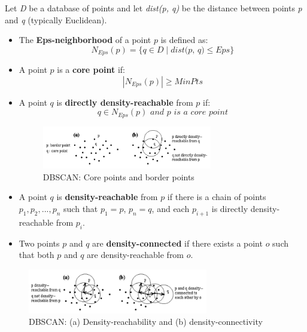 \documentclass[a4paper,12pt,twoside]{scrreprt}
\begin{document}
Let \textit{D} be a database of points and let \textit{dist(p, q)} be the
distance between points \textit{p} and \textit{q} (typically Euclidean).

\begin{itemize}
  \item The \textbf{Eps-neighborhood} of a point $p$ is defined as:
        \[
          N_{\textit{Eps}}(p) = \{q \in D \mid \textit{dist(p, q)} \leq
          \textit{Eps} \}
        \]

  \item A point $p$ is a \textbf{core point} if:
        \[
          |N_{\textit{Eps}}(p)| \geq \textit{MinPts}
        \]

  \item A point $q$ is \textbf{directly density-reachable} from $p$ if:
        \[
          q \in N_{\textit{Eps}}(p) \textit{ and } p \textit{ is a core point}
        \]

        \begin{figure}[htbp]
          \centering

          \includegraphics[width=0.7\textwidth]{Figures/background/dbscan_core_points_and_border_points.png}
          \caption{DBSCAN: Core points and border points
            \cite{ester_density-based_nodate}}
          \label{fig:dbscan-core_points}
        \end{figure}

  \item A point $q$ is \textbf{density-reachable} from $p$ if there is a chain
        of points
        $p_1, p_2, ..., p_n$ such that $p_1 = p$, $p_n = q$, and each $p_{i+1}$
        is
        directly
        density-reachable from $p_i$.

  \item Two points $p$ and $q$ are \textbf{density-connected} if there exists a
        point
        $o$ such that both $p$ and $q$ are density-reachable from $o$.
\end{itemize}

\begin{figure}[htbp]
  \centering

  \includegraphics[width=0.7\textwidth]{Figures/background/dbscan_density_reachability_connectivity.png}
  \caption{DBSCAN: (a) Density-reachability and (b) density-connectivity
    \cite{ester_density-based_nodate}}
  \label{fig:dbscan-reachability-and-connectivity}
\end{figure}
\FloatBarrier
\end{document}
